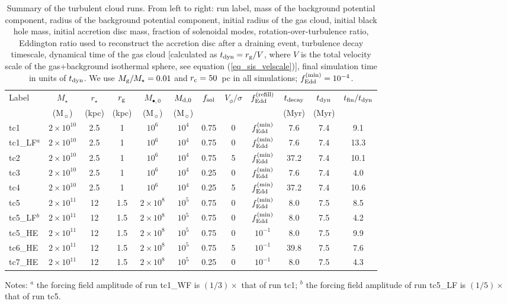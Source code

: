 \documentclass[a4paper,fleqn,usenatbib]{mnras}
\begin{document}
\begin{table*}
\caption{Summary of the turbulent cloud runs.
From left to right: run label, mass of the background potential component, radius of the background potential component, initial radius of the gas cloud, initial black hole mass, initial accretion disc mass, fraction of solenoidal modes, rotation-over-turbulence ratio, Eddington ratio used to reconstruct the accretion disc after a draining event, turbulence decay timescale, dynamical time of the gas cloud [calculated as $t_{\rm dyn} = r_{\rm g} / V$, where $V$ is the total velocity scale of the gas+background isothermal sphere, see equation (\ref{eq_sis_velscale})], final simulation time in units of $t_{\rm dyn}$.
We use $M_{\rm g}/M_{\star} = 0.01$ and $r_{\rm c} = 50$~pc in all simulations; $f_{\rm Edd}^{\rm (min)} = 10^{-4}$.
}
\label{tab_tc_runs}
\begin{tabular}{lccccccccccc}
\hline
Label & $M_{\star}$ & $r_{\star}$ & $r_{\rm g}$ & $M_{\bullet,0}$ & $M_{\rm d,0}$ & $f_{\rm sol}$ & $V_{\phi}/\sigma$ & $f_{\rm Edd}^{\rm (refill)}$ & $t_{\rm decay}$ & $t_{\rm dyn}$ & $t_{\rm fin} / t_{\rm dyn}$ \\
 & (M$_{\sun}$) & (kpc) & (kpc) & (M$_{\sun}$) & (M$_{\sun}$) &  & & & (Myr) & (Myr) & \\
\hline
tc1     & $2 \times 10^{10}$ & 2.5 & 1 & $10^{6}$ & $10^4$ & 0.75 & 0 & $f_{\rm Edd}^{\rm (min)}$ & 7.6  & 7.4 & 9.1 \\
tc1\_LF$^{a}$ & $2 \times 10^{10}$ & 2.5 & 1 & $10^{6}$ & $10^4$ & 0.75 & 0 & $f_{\rm Edd}^{\rm (min)}$ & 7.6  & 7.4 & 13.3 \\
tc2     & $2 \times 10^{10}$ & 2.5 & 1 & $10^{6}$ & $10^4$ & 0.75 & 5 & $f_{\rm Edd}^{\rm (min)}$ & 37.2 & 7.4 & 10.1 \\
tc3     & $2 \times 10^{10}$ & 2.5 & 1 & $10^{6}$ & $10^4$ & 0.25 & 0 & $f_{\rm Edd}^{\rm (min)}$ & 7.6  & 7.4 & 4.0 \\
tc4     & $2 \times 10^{10}$ & 2.5 & 1 & $10^{6}$ & $10^4$ & 0.25 & 5 & $f_{\rm Edd}^{\rm (min)}$ & 37.2 & 7.4 & 10.6 \\
\hline
tc5     & $2 \times 10^{11}$ & 12 & 1.5 & $2 \times 10^{8}$ & $10^5$ & 0.75 & 0 & $f_{\rm Edd}^{\rm (min)}$ & 8.0 & 7.5 & 8.5 \\
tc5\_LF$^{b}$ & $2 \times 10^{11}$ & 12 & 1.5 & $2 \times 10^{8}$ & $10^5$ & 0.75 & 0 & $f_{\rm Edd}^{\rm (min)}$ & 8.0 & 7.5 & 4.2 \\
tc5\_HE & $2 \times 10^{11}$ & 12 & 1.5 & $2 \times 10^{8}$ & $10^5$ & 0.75 & 0 & $10^{-1}$ & 8.0 & 7.5 & 9.9 \\
tc6\_HE & $2 \times 10^{11}$ & 12 & 1.5 & $2 \times 10^{8}$ & $10^5$ & 0.75 & 5 & $10^{-1}$ & 39.8 & 7.5 & 7.6 \\
tc7\_HE & $2 \times 10^{11}$ & 12 & 1.5 & $2 \times 10^{8}$ & $10^5$ & 0.25 & 0 & $10^{-1}$ & 8.0 & 7.5 & 4.3 \\
\hline
\end{tabular}
\flushleft
Notes: $^{a}$ the forcing field amplitude of run tc1\_WF is $(1/3) \times$ that of run tc1; 
$^{b}$ the forcing field amplitude of run tc5\_LF is $(1/5) \times$ that of run tc5.
\end{table*}
\end{document}
